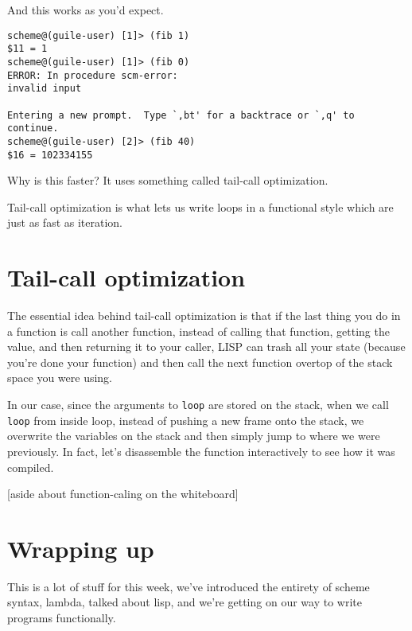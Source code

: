 \documentclass[11pt]{article}
\begin{document}
And this works as you'd expect. 
\begin{verbatim}
scheme@(guile-user) [1]> (fib 1)
$11 = 1
scheme@(guile-user) [1]> (fib 0)
ERROR: In procedure scm-error:
invalid input

Entering a new prompt.  Type `,bt' for a backtrace or `,q' to continue.
scheme@(guile-user) [2]> (fib 40)
$16 = 102334155
\end{verbatim}

Why is this faster? It uses something called tail-call optimization.

Tail-call optimization is what lets us write loops in a functional
style which are just as fast as iteration.

\section{Tail-call optimization}
\label{sec:org89fcf66}
The essential idea behind tail-call optimization is that if the
last thing you do in a function is call another function, instead
of calling that function, getting the value, and then returning it
to your caller, LISP can trash all your state (because you're done
your function) and then call the next function overtop of the stack
space you were using.

In our case, since the arguments to \texttt{loop} are stored on the stack,
when we call \texttt{loop} from inside loop, instead of pushing a new
frame onto the stack, we overwrite the variables on the stack and
then simply jump to where we were previously. In fact, let's
disassemble the function interactively to see how it was compiled.

[aside about function-caling on the whiteboard]

\section{Wrapping up}
\label{sec:org3d06ddd}
This is a lot of stuff for this week, we've introduced the entirety
of scheme syntax, lambda, talked about lisp, and we're getting on
our way to write programs functionally.
\end{document}
